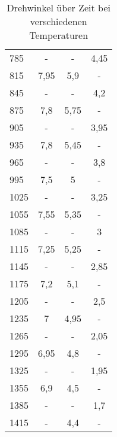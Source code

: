 \begin{wraptable}{l}{0.3\linewidth}
\begin{tabular}{l|ccc}
785     & -               & -               & 4,45\\
815     & 7,95            & 5,9             & -\\
845     & -               & -               & 4,2\\
875     & 7,8             & 5,75            & -\\
905     & -               & -               & 3,95\\
935     & 7,8             & 5,45            & -\\
965     & -               & -               & 3,8\\
995     & 7,5             & 5               & -\\
1025    & -               & -               & 3,25\\
1055    & 7,55            & 5,35            & -\\
1085    & -               & -               & 3\\
1115    & 7,25            & 5,25            & -\\
1145    & -               & -               & 2,85\\
1175    & 7,2             & 5,1             & -\\
1205    & -               & -               & 2,5\\
1235    & 7               & 4,95            & -\\
1265    & -               & -               & 2,05\\
1295    & 6,95            & 4,8             & -\\
1325    & -               & -               & 1,95\\
1355    & 6,9             & 4,5             & -\\
1385    & -               & -               & 1,7\\
1415    & -               & 4,4             & -\\
		\hline
	\end{tabular}
	\caption{Drehwinkel über Zeit bei verschiedenen Temperaturen}
	\label{tab:Rohdaten}
\end{wraptable}

